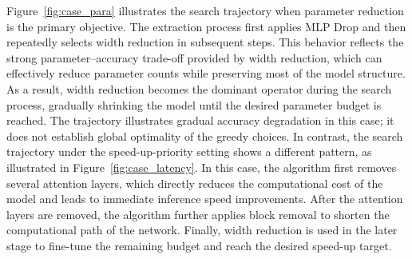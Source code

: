 \documentclass[11pt]{article}
\begin{document}
Figure~\ref{fig:case_para} illustrates the search trajectory when parameter reduction is the primary objective. The extraction process first applies MLP Drop and then repeatedly selects width reduction in subsequent steps. This behavior reflects the strong parameter–accuracy trade-off provided by width reduction, which can effectively reduce parameter counts while preserving most of the model structure. As a result, width reduction becomes the dominant operator during the search process, gradually shrinking the model until the desired parameter budget is reached. The trajectory illustrates gradual accuracy degradation in this case; it does not establish global optimality of the greedy choices.
In contrast, the search trajectory under the speed-up-priority setting shows a different pattern, as illustrated in Figure~\ref{fig:case_latency}. In this case, the algorithm first removes several attention layers, which directly reduces the computational cost of the model and leads to immediate inference speed improvements. After the attention layers are removed, the algorithm further applies block removal to shorten the computational path of the network. Finally, width reduction is used in the later stage to fine-tune the remaining budget and reach the desired speed-up target.




\end{document}
